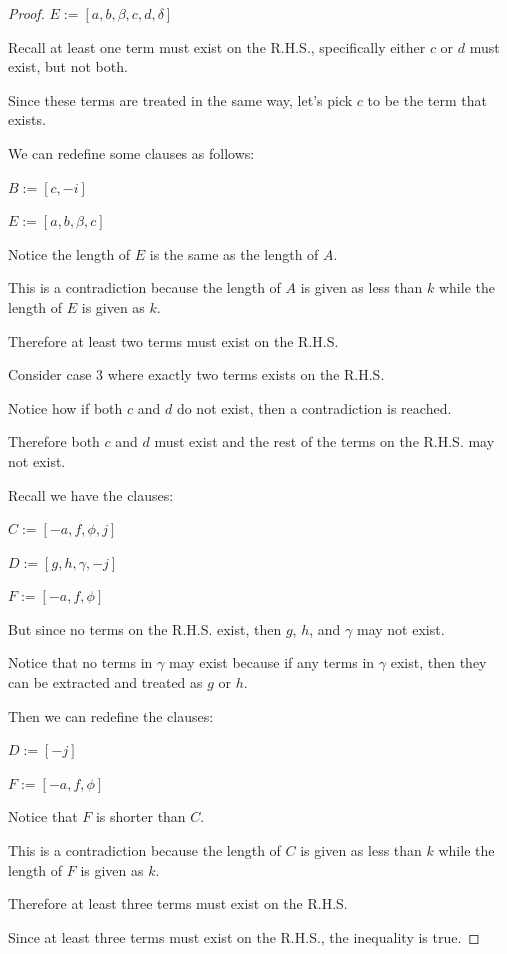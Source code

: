 \documentclass[manuscript]{acmart}
\begin{document}
\begin{proof}
        $E := [a, b, \beta, c, d, \delta]$

        Recall at least one term must exist on the R.H.S., specifically either $c$ or $d$ must exist, but not both.

        Since these terms are treated in the same way, let's pick $c$ to be the term that exists.

        We can redefine some clauses as follows:

        $B := [c, -i]$

        $E := [a, b, \beta, c]$

        Notice the length of $E$ is the same as the length of $A$.

        This is a contradiction because the length of $A$ is given as less than $k$ while the length of $E$ is given as $k$.

        Therefore at least two terms must exist on the R.H.S.

        Consider case 3 where exactly two terms exists on the R.H.S.

        Notice how if both $c$ and $d$ do not exist, then a contradiction is reached. 

        Therefore both $c$ and $d$ must exist and the rest of the terms on the R.H.S. may not exist.

        Recall we have the clauses:

        $C := [-a, f, \phi, j]$

        $D := [g, h, \gamma, -j]$

        $F := [-a, f, \phi]$

        But since no terms on the R.H.S. exist, then $g$, $h$, and $\gamma$ may not exist. 

        Notice that no terms in $\gamma$ may exist because if any terms in $\gamma$ exist, then they can be extracted and treated as $g$ or $h$.

        Then we can redefine the clauses:

        $D := [-j]$

        $F := [-a, f, \phi]$

        Notice that $F$ is shorter than $C$.

        This is a contradiction because the length of $C$ is given as less than $k$ while the length of $F$ is given as $k$.

        Therefore at least three terms must exist on the R.H.S.

        Since at least three terms must exist on the R.H.S., the inequality is true.


\end{proof}
\end{document}
